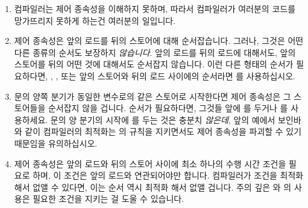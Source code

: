 \begin{enumerate}
\item	컴파일러는 제어 종속성을 이해하지 못하며, 따라서 컴파일러가 여러분의
	코드를 망가뜨리지 못하게 하는건 여러분의 일입니다.

\item	제어 종속성은 앞의 로드를 뒤의 스토어에 대해 순서잡습니다.
	그러나, 그것은 어떤 다른 종류의 순서도 보장하지 \emph{않습니다}.
	앞의 로드를 뒤의 로드에 대해서도, 앞의 스토어를 뒤의 어떤 것에 대해서도
	순서잡지 않습니다.
	이런 다른 형태의 순서가 필요하다면, , ,
	또는 앞의 스토어와 뒤의 로드 사이에의 순서라면  를
	사용하십시오.

\item	{} 문의 양쪽 분기가 동일한 변수로의 같은 스토어로 시작한다면 제어
	종속성은 그 스토어들을 순서잡지 않을 겁니다.
	순서가 필요하다면, 그것들 앞에  를 두거나
	 를 사용하세요.
	 문의 양 분기의 시작에  를 두는 것은 충분치
	\emph{않은데}, 앞의 예에서 보인바와 같이 컴파일러의 최적화는
	 의 규칙을 지키면서도 제어 종속성을 파괴할 수 있기
	때문임을 유의하십시오.

\item	제어 종속성은 앞의 로드와 뒤의 스토어 사이에 최소 하나의 수행 시간
	조건을 필요로 하며, 이 조건은 앞의 로드와 연관되어야만 합니다.
	컴파일러가 조건을 최적화 해서 없앨 수 있다면, 이는 순서 역시 최적화
	해서 없앨 겁니다.
	주의 깊은  와  의 사용은 필요한 조건을
	지키는 걸 도울 수 있습니다.


\end{enumerate}
